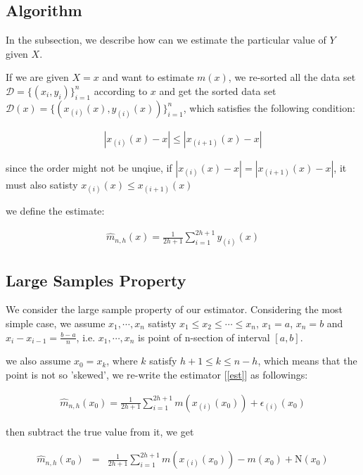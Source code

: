 \documentclass[twoside]{article}
\begin{document}
\subsection{Algorithm}

In the subsection, we describe how can we estimate the particular value of $Y$ given $X$.

If we are given $X=x$ and want to estimate $m(x)$, we re-sorted all the data set $\mathcal{D}=\{(x_i,y_i)\}_{i=1}^n$ according to $x$ and get the sorted data set $\mathcal{D}(x)=\{(x_{(i)}(x),y_{(i)}(x))\}_{i=1}^n$, which satisfies the following condition:

\begin{eqnarray}
  |x_{(i)}(x)-x|\le|x_{(i+1)}(x)-x|
\end{eqnarray}

since the order might not be unqiue, if $|x_{(i)}(x)-x|=|x_{(i+1)}(x)-x|$, it must also satisty $x_{(i)}(x)\le x_{(i+1)}(x)$

we define the estimate:

\begin{eqnarray}
\label{est}
  \hat{m}_{n,h}(x)=\frac{1}{2h+1}\sum_{i=1}^{2h+1}{y_{(i)}(x)}
\end{eqnarray}

\subsection{Large Samples Property}

We consider the large sample property of our estimator. Considering the most simple case, we assume $x_1,\cdots,x_n$ satisty $x_1\le x_2\le \cdots \le x_n$, $x_1=a$, $x_n=b$ and $x_i-x_{i-1}=\frac{b-a}{n}$, i.e. $x_1,\cdots,x_n$ is point of n-section of interval $[a,b]$.

we also assume $x_0=x_k$, where $k$ satisfy $h+1\le k\le n-h$, which means that the point is not so 'skewed', we re-write the estimator [\ref{est}] as followings:

\begin{eqnarray}
  \hat{m}_{n,h}(x_0)=\frac{1}{2h+1}\sum_{i=1}^{2h+1}{m(x_{(i)}(x_0))+\epsilon_{(i)}(x_0)} \nonumber
\end{eqnarray} 

then subtract the true value from it, we get

\begin{eqnarray}
  \hat{m}_{n,h}(x_0)&=&\frac{1}{2h+1}\sum_{i=1}^{2h+1}{m(x_{(i)}(x_0))-m(x_0)}+\mathrm{N}(x_0) \nonumber
\end{eqnarray} 
\end{document}
